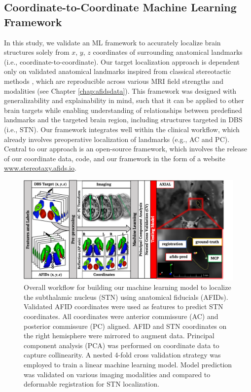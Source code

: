 \subsection{Coordinate-to-Coordinate Machine Learning Framework}
In this study, we validate an ML framework to accurately localize brain structures solely from $x$, $y$, $z$ coordinates of surrounding anatomical landmarks (i.e., coordinate-to-coordinate). Our target localization approach is dependent only on validated anatomical landmarks inspired from classical stereotactic methods \cite{Lau2019-eh, Abbass2022-lf}, which are reproducible across various MRI field strengths and modalities (see Chapter \ref{chap:afidsdata}). This framework was designed with generalizability and explainability in mind, such that it can be applied to other brain targets while enabling understanding of relationships between predefined landmarks and the targeted brain region, including structures targeted in DBS (i.e., STN). Our framework integrates well within the clinical workflow, which already involves preoperative localization of landmarks (e.g., AC and PC). Central to our approach is an open-source framework, which involves the release of our coordinate data, code, and our framework in the form of a website \url{www.stereotaxy.afids.io}.

\begin{figure}[hbt!]
    \centering
    \includegraphics[width=1\linewidth]{figs/ch4_Figure_afidspred.png}
    \caption{Overall workflow for building our machine learning model to localize the subthalamic nucleus (STN) using anatomical fiducials (AFIDs). Validated AFID coordinates were used as features to predict STN coordinates. All coordinates were anterior commissure (AC) and posterior commissure (PC) aligned. AFID and STN coordinates on the right hemisphere were mirrored to augment data. Principal component analysis (PCA) was performed on coordinate data to capture collinearity. A nested 4-fold cross validation strategy was employed to train a linear machine learning model. Model prediction was validated on various imaging modalities and compared to deformable registration for STN localization.}
    \label{fig:ch4_Figure_afidspred}
\end{figure}

